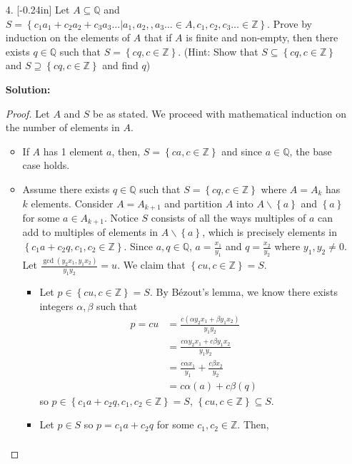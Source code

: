 \documentclass[letterpaper,12pt]{article}
\newcommand{\set}[1]{\left\{ #1 \right\}}
\theoremstyle{definition}
\begin{document}
\pagebreak
\begin{enumerate}
    \item[4.]\reversemarginpar{}[-0.24in] 
  Let $A\subseteq \mathbb{Q}$ and $S = \set{c_1a_1 + c_2a_2 + c_3a_3 \ldots | a_1,a_2,,a_3\ldots \in A, c_1,c_2,c_3 \ldots \in \mathbb{Z}}$. Prove by induction on the elements of $A$ that if $A$ is finite and non-empty, then there exists $q \in \mathbb{Q}$ such that $S = \set{cq, c \in \mathbb{Z}}$. (Hint: Show that $S \subseteq \set{cq, c \in \mathbb{Z}}$ and $S \supseteq \set{cq, c \in \mathbb{Z}}$ and find $q$)
  \begin{mdframed}
  \textbf{Solution:}
      \begin{proof}
          Let $A$ and $S$ be as stated. We proceed with mathematical induction on the number of elements in $A$. \begin{itemize}
        \item If $A$ has 1 element $a$, then, $S = \set{ca, c \in \mathbb{Z}}$ and since $a \in \mathbb{Q}$, the base case holds.
        \item Assume there exists $q \in \mathbb{Q}$ such that $S = \set{cq, c \in \mathbb{Z}}$ where $A=A_{k}$ has $k$ elements. Consider $A=A_{k+1}$ and partition $A$ into $A\backslash \set{a}$ and $\set{a}$ for some $a \in A_{k+1}$. Notice $S$ consists of all the ways multiples of $a$ can add to multiples of elements in $ A\backslash \set{a}$, which is precisely elements in $\set{c_1 a + c_2 q, c_1,c_2 \in \mathbb{Z}}$. Since $a,q \in \mathbb{Q}$, $a = \frac{x_1}{y_1}$ and $q = \frac{x_2}{y_2}$ where $y_1,y_2 \neq 0$. Let $\frac{\gcd (y_2x_1,y_1x_2)}{y_1y_2} = u$. We claim that $\set{ cu, c \in \mathbb{Z} } = S$. \begin{itemize}
            \item Let $p \in \set{ cu, c \in \mathbb{Z} } = S$. By Bézout's lemma, we know there exists integers $\alpha,\beta$ such that \begin{align*}
                p = cu &= \frac{c( \alpha y_2x_1 + \beta y_1x_2)}{y_1y_2} \\
                &= \frac{c\alpha y_2x_1 + c\beta y_1x_2}{y_1y_2} \\
                &= \frac{c\alpha x_1}{y_1} + \frac{c\beta x_2}{y_2} \\
                &= c\alpha(a) + c\beta(q)
            \end{align*}
            so $p \in \set{c_1 a + c_2 q, c_1,c_2 \in \mathbb{Z}} = S$, $\set{ cu, c \in \mathbb{Z} } \subseteq S$.
            \item Let $p \in S$ so $p = c_1a + c_2 q$ for some $c_1, c_2 \in \mathbb{Z}$. Then, \begin{align*}

\end{align*}
\end{itemize}
\end{itemize}
\end{proof}
\end{mdframed}
\end{enumerate}
\end{document}

